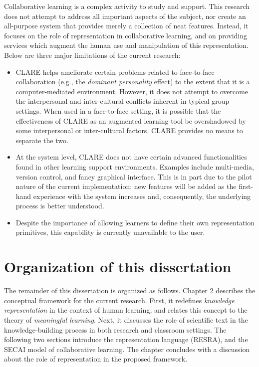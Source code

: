 Collaborative learning is a complex activity to study and support. This
research does not attempt to address all important aspects of the subject,
nor create an all-purpose system that provides merely a collection of neat
features. Instead, it focuses on the role of representation in
collaborative learning, and on providing services which augment the human
use and manipulation of this representation. Below are three major
limitations of the current research:

\begin{itemize}
\item CLARE helps ameliorate certain problems related to face-to-face
  collaboration (e.g., the {\it dominant personality\/} effect) to the
  extent that it is a computer-mediated environment. However, it does not
  attempt to overcome the interpersonal and inter-cultural conflicts
  inherent in typical group settings. When used in a face-to-face
  setting, it is possible that the effectiveness of CLARE as an augmented
  learning tool be overshadowed by some interpersonal or inter-cultural
  factors. CLARE provides no means to separate the two.
  
\item At the system level, CLARE does not have certain advanced
  functionalities found in other learning support environments. Examples
  include multi-media, version control, and fancy graphical interface. This
  is in part due to the pilot nature of the current implementation; new
  features will be added as the first-hand experience with the system
  increases and, consequently, the underlying process is better understood.
  
\item Despite the importance of allowing learners to define their own
  representation primitives, this capability is currently unavailable to
  the user.
\end{itemize}


\section{Organization of this dissertation}
\label{sec:organization}

The remainder of this dissertation is organized as follows. Chapter 2
describes the conceptual framework for the current research. First, it
redefines {\it knowledge representation\/} in the context of human
learning, and relates this concept to the theory of {\it meaningful
learning\/}. Next, it discusses the role of scientific text in the
knowledge-building process in both research and classroom settings. The
following two sections introduce the representation language (RESRA), and
the SECAI model of collaborative learning. The chapter concludes with a
discussion about the role of representation in the proposed framework.


